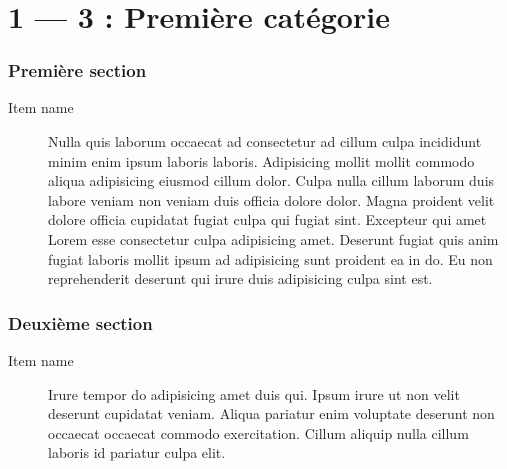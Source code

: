 \documentclass{article}
\author{}
\begin{document}
\title{\vspace{-0.5cm}{\Huge Titre du document} \vspace{-1cm}}

\date{}

\maketitle



\part*{1 --- 3 : Première catégorie}
\section{Première section}
\begin{description}
	\item [Item name] Nulla quis laborum occaecat ad consectetur ad cillum culpa incididunt minim enim ipsum laboris laboris. Adipisicing mollit mollit commodo aliqua adipisicing eiusmod cillum dolor. Culpa nulla cillum laborum duis labore veniam non veniam duis officia dolore dolor. Magna proident velit dolore officia cupidatat fugiat culpa qui fugiat sint. Excepteur qui amet Lorem esse consectetur culpa adipisicing amet. Deserunt fugiat quis anim fugiat laboris mollit ipsum ad adipisicing sunt proident ea in do. Eu non reprehenderit deserunt qui irure duis adipisicing culpa sint est.
\end{description}
\section{Deuxième section}
\begin{description}
	\item [Item name] Irure tempor do adipisicing amet duis qui. Ipsum irure ut non velit deserunt cupidatat veniam. Aliqua pariatur enim voluptate deserunt non occaecat occaecat commodo exercitation. Cillum aliquip nulla cillum laboris id pariatur culpa elit.
\end{description}
\end{document}

